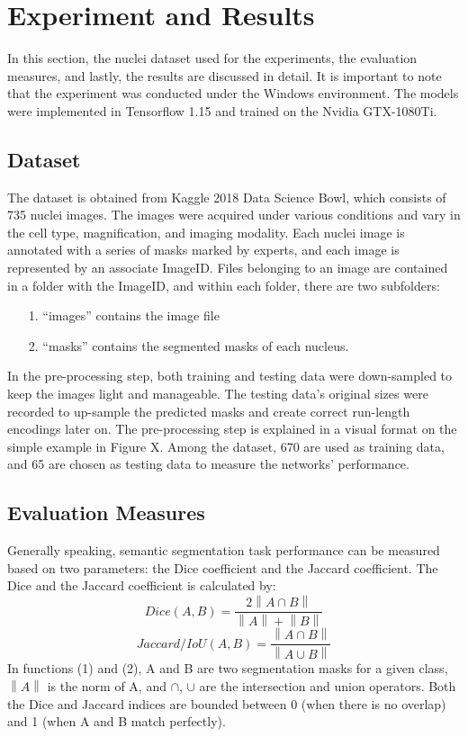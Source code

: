 \documentclass{article}
\begin{document}
\section{Experiment and Results}
In this section, the nuclei dataset used for the experiments, the evaluation measures, and lastly, the results are discussed in detail. It is important to note that the experiment was conducted under the Windows environment. The models were implemented in Tensorflow 1.15 and trained on the Nvidia GTX-1080Ti.

\subsection{Dataset}
The dataset is obtained from Kaggle 2018 Data Science Bowl\cite{kaggle_2018}, which consists of 735 nuclei images. The images were acquired under various conditions and vary in the cell type, magnification, and imaging modality. Each nuclei image is annotated with a series of masks marked by experts, and each image is represented by an associate ImageID. Files belonging to an image are contained in a folder with the ImageID, and within each folder, there are two subfolders:

\begin{itemize}
    \item[1.]“images” contains the image file
    \item[2.]“masks” contains the segmented masks of each nucleus.
\end{itemize}

In the pre-processing step, both training and testing data were down-sampled to keep the images light and manageable. The testing data's original sizes were recorded to up-sample the predicted masks and create correct run-length encodings later on. The pre-processing step is explained in a visual format on the simple example in Figure X. Among the dataset, 670 are used as training data, and 65 are chosen as testing data to measure the networks' performance.

\subsection{Evaluation Measures}
Generally speaking, semantic segmentation task performance can be measured based on two parameters: the Dice coefficient and the Jaccard coefficient. The Dice and the Jaccard coefficient is calculated by:
\begin{equation}
    Dice(A,B) = \frac{2\left \| A \cap B \right \|}{\left \| A \right \|+\left \| B \right \|}
\end{equation}
\begin{equation}
    Jaccard/IoU(A,B) = \frac{\left \| A \cap B \right \|}{\left \| A\cup B \right \|}
\end{equation}
In functions (1) and (2), A and B are two segmentation masks for a given class, $\left \| A \right \|$ is the norm of A, and $\cap$, $\cup$ are the intersection and union operators. Both the Dice and Jaccard indices are bounded between 0 (when there is no overlap) and 1 (when A and B match perfectly).
\end{document}
